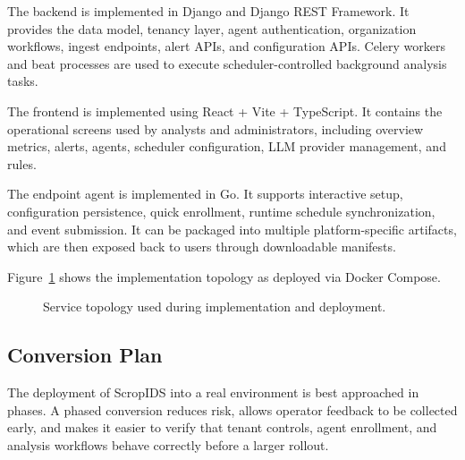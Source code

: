 \documentclass[12pt,a4paper]{article}
\begin{document}
The backend is implemented in Django and Django REST Framework. It provides the data model, tenancy layer, agent authentication, organization workflows, ingest endpoints, alert APIs, and configuration APIs. Celery workers and beat processes are used to execute scheduler-controlled background analysis tasks.

The frontend is implemented using React + Vite + TypeScript. It contains the operational screens used by analysts and administrators, including overview metrics, alerts, agents, scheduler configuration, LLM provider management, and rules.

The endpoint agent is implemented in Go. It supports interactive setup, configuration persistence, quick enrollment, runtime schedule synchronization, and event submission. It can be packaged into multiple platform-specific artifacts, which are then exposed back to users through downloadable manifests.

Figure~\ref{fig:deployment-topology} shows the implementation topology as deployed via Docker Compose.

\begin{figure}[H]
\centering
{}
\caption{Service topology used during implementation and deployment.}
\label{fig:deployment-topology}
\end{figure}

\subsection{Conversion Plan}
The deployment of ScropIDS into a real environment is best approached in phases. A phased conversion reduces risk, allows operator feedback to be collected early, and makes it easier to verify that tenant controls, agent enrollment, and analysis workflows behave correctly before a larger rollout.
\end{document}

